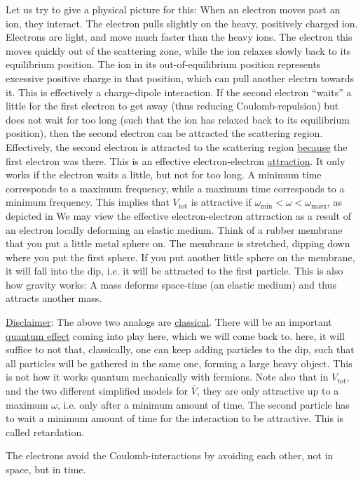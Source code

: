 Let us try to give a physical picture for this: When an electron moves past an ion, they interact. The electron pulls slightly on the heavy, positively charged ion. Electrons are light, and move much faster than the heavy ions. The electron this moves quickly out of the scattering zone, while the ion relaxes slowly back to its equilibrium position. The ion in its out-of-equilibrium position represents excessive positive charge in that position, which can pull another electrn towards it. This is effectively a charge-dipole interaction. If the second electron ``waits'' a little for the first electron to get away (thus reducing Coulomb-repulsion) but does not wait for too long (such that the ion has relaxed back to its equilibrium position), then the second electron can be attracted the scattering region. Effectively, the second electron is attracted to the scattering region \underline{because} the first electron was there. This is an effective electron-electron \underline{attraction}. It only works if the electron waits a little, but not for too long. 
A minimum time corresponds to a maximum frequency, while a maximum time corresponds to a minimum frequency. This implies that $V_{\text{tot}}$ is attractive if $\omega_\text{min} <\omega<\omega_\text{masx}$, as depicted in 
We may view the effective electron-electron attrraction as a result of an electron locally deforming an elastic medium. Think of a rubber membrane that you put a little metal sphere on. The membrane is stretched, dipping down where you put the first sphere. If you put another little sphere on the membrane, it will fall into the dip, i.e. it will be attracted to the first particle.
This is also how gravity works: A mass deforms space-time (an elastic medium) and thus attracts another mass. 

\underline{Disclaimer}: The above two analogs are \underline{classical}. There will be an important \underline{quantum effect} coming into play here, which we will come back to. here, it will suffice to not that, classically, one can keep adding particles to the dip, such that all particles will be gathered in the same one, forming a large heavy object. This is not how it works quantum mechanically with fermions. Note also that in $V_{\text{tot}}$, and the two different simplified models for $\bar V$, they are only attractive up to a maximum $\omega$, i.e. only after a minimum amount of time. The second particle has to wait a minimum amount of time for the interaction to be attractive. This is called retardation. 
\begin{tcolorbox}
	The electrons avoid the Coulomb-interactions by avoiding each other, not in space, but in time. 
\end{tcolorbox}


